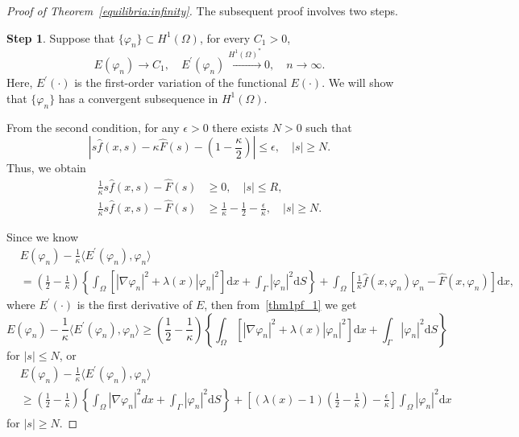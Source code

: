 \documentclass{elsarticle}
\begin{document}
\begin{proof}[Proof of Theorem~\ref{equilibria:infinity}]
The subsequent proof involves two steps.

\textbf{Step 1}. Suppose that $\{\varphi_n\}\subset H^{1}(\Omega)$, for every $C_1>0$,
\[
	E(\varphi_n)\rightarrow C_1,\quad E^{\prime}(\varphi_n)\xrightarrow[]{H^{1}(\Omega)^{\ast}} 0, \quad n\rightarrow\infty.
\]
Here, $E^{\prime}(\cdot)$ is the first-order variation of the functional $E(\cdot)$.
We will show that $\{\varphi_n\}$ has a convergent subsequence in $H^{1}(\Omega)$. 


From the second condition, for any $\epsilon > 0$ there exists $N>0$ such that 
\[
	\left|s\hat{f}(x, s)-\kappa\hat{F}(s) - \left( 1-\frac{\kappa}{2} \right)\right| \leqslant \epsilon, \quad |s| \geqslant N.
\] 
Thus, we obtain
\begin{equation}\label{thm1pf_1}
\begin{split}
	\frac{1}{\kappa}s\hat{f}(x, s)-\hat{F}(s) &\geqslant 0, \quad  |s| \leqslant R, \\
	\frac{1}{\kappa}s\hat{f}(x, s)-\hat{F}(s) &\geqslant \frac{1}{\kappa}-\frac{1}{2}-\frac{\epsilon}{\kappa}, \quad  |s| \geqslant N.
\end{split}
\end{equation}

Since we know
\begin{equation*}
\begin{split}
	&E(\varphi_n) - \frac{1}{\kappa}\langle E^{\prime}(\varphi_n), \varphi_n \rangle\\
	&=\left( \frac{1}{2} - \frac{1}{\kappa}\right)\left\{\int_{\Omega}\left[ |\nabla\varphi_n|^2 + \lambda(x)|\varphi_n|^2\right]\mathrm{d}x+\int_{\Gamma}|\varphi_n|^2\mathrm{d}S\right\}+ \int_{\Omega}\left[\frac{1}{\kappa}\hat{f}(x, \varphi_n)\varphi_n - \hat{F}(x, \varphi_n)\right]\mathrm{d}x,
\end{split}
\end{equation*}
where $E^{\prime}(\cdot)$ is the first derivative of $E$, then from~\eqref{thm1pf_1} we get
\begin{equation*}
	E(\varphi_n) - \frac{1}{\kappa}\langle E^{\prime}(\varphi_n), \varphi_n \rangle\geqslant\left( \frac{1}{2} - \frac{1}{\kappa}\right)\left\{\int_{\Omega}\left[ |\nabla\varphi_n|^2 + \lambda(x)|\varphi_n|^2\right]\mathrm{d}x+\int_{\Gamma}|\varphi_n|^2\mathrm{d}S\right\}
\end{equation*}
for $ |s| \leqslant N$, or
\begin{equation*}
\begin{split}
	&E(\varphi_n) - \frac{1}{\kappa}\langle E^{\prime}(\varphi_n), \varphi_n \rangle\\
	&\geqslant\left( \frac{1}{2} - \frac{1}{\kappa}\right)\left\{\int_{\Omega}|\nabla\varphi_n|^2 dx+\int_{\Gamma}|\varphi_n|^2\mathrm{d}S\right\}+ \left[(\lambda(x)-1)\left(\frac{1}{2} - \frac{1}{\kappa}\right) - \frac{\epsilon}{\kappa}\right]\int_{\Omega}|\varphi_n|^2\mathrm{d}x
\end{split}
\end{equation*}
for $ |s| \geqslant N$.


\end{proof}
\end{document}
